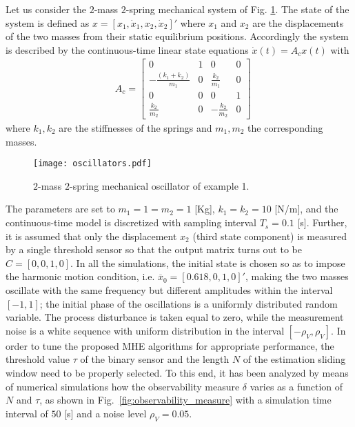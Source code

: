 \documentclass[11pt,journal,onecolumn]{IEEEtran}
\begin{document}
Let us consider the $2$-mass $2$-spring mechanical system of Fig. \ref{fig:oscillators}.
The state of the system is defined as $x=\left[x_{1},\dot{x}_{1},x_{2},\dot{x}_{2}\right]'$ where $x_{1}$ and $x_{2}$ are the displacements of the two masses from their static equilibrium positions.
Accordingly the system is described by the continuous-time linear state equations $\dot{x}(t) = A_c x(t)$ with
\begin{equation}
\begin{split}
&A_{c}=\begin{bmatrix} 0 & 1 & 0 & 0 \\ -\frac{(k_{1}+k_{2})}{m_{1}} & 0 & \frac{k_{2}}{m_{1}} & 0 \\ 0 & 0 & 0 & 1 \\ \frac{k_{2}}{m_{2}} & 0 & -\frac{k_{2}}{m_{2}} & 0 \end{bmatrix}\end{split}
\end{equation}
where $k_{1}, k_{2}$ are the stiffnesses of the springs and $m_{1}, m_{2}$ the corresponding masses.
\begin{figure}[h!]
\centering
\texttt{[image: oscillators.pdf]}\caption{$2$-mass $2$-spring mechanical oscillator of example 1.}
\label{fig:oscillators}
\end{figure}
The parameters are set to $m_{1}=1=m_{2}=1$ [Kg], $k_{1}=k_{2}=10$ [N/m], and the  continuous-time model is discretized with sampling interval $T_s = 0.1$ [s]. Further, it is assumed that only the displacement $x_2$ (third state component) is measured by a single threshold sensor so that the output matrix turns out to be $C = \left[ 0, 0, 1, 0 \right]$. In all the simulations, the initial state is chosen so as to impose the harmonic motion condition, i.e. $\overline{x}_{0} = [0.618, 0, 1, 0]'$, making the two masses oscillate with the same frequency but different amplitudes within the interval $[-1,1]$; the initial phase of the oscillations is a uniformly distributed random variable. The process disturbance is taken equal to zero, while the measurement noise is a white sequence with uniform distribution in the interval $[-\rho_V,\rho_V]$. In order to tune the proposed MHE algorithms for appropriate performance, the threshold value $\tau$ of the binary sensor and the length $N$ of the estimation sliding window need to be properly selected. To this end, it has been analyzed by means of numerical simulations how the observability measure $\delta$ varies as a function of $N$ and $\tau$, as shown in Fig.~\ref{fig:observability_measure} with a simulation time interval of $50$ [s] and a noise level $\rho_{V} = 0.05$.
\end{document}
